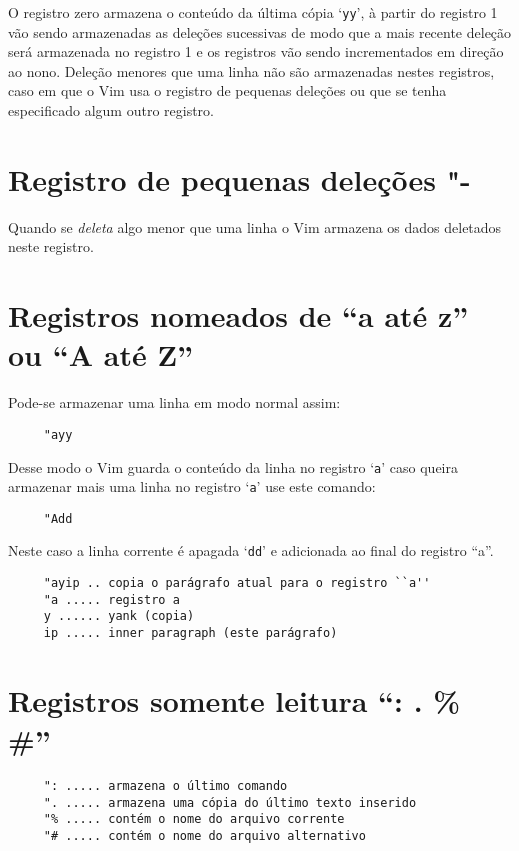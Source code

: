 O registro zero armazena o conteúdo da última cópia `{\tt yy}', à partir do
registro 1 vão sendo armazenadas as deleções sucessivas de modo que a
mais recente deleção será armazenada no registro 1 e os registros vão
sendo incrementados em direção ao nono.  Deleção menores que uma linha
não são armazenadas nestes registros, caso em que o Vim usa o registro
de pequenas deleções ou que se tenha especificado algum outro
registro.


\section{Registro de pequenas deleções "-}
\label{Registro de pequenas deleções "-}

Quando se {\em deleta} algo menor que uma linha o Vim armazena os dados
deletados neste registro.

\section{Registros nomeados de ``a até z'' ou ``A até Z''}
\label{Registros nomeados de ``a até z'' ou ``A até Z''}
Pode-se armazenar uma linha em modo normal assim:

\begin{verbatim}
     "ayy
\end{verbatim}

Desse modo o Vim guarda o conteúdo da linha no registro `{\tt a}' caso
queira armazenar mais uma linha no registro `{\tt a}' use este comando:

\begin{verbatim}
     "Add
\end{verbatim}

Neste caso a linha corrente é apagada `{\tt dd}' e  adicionada ao final do
registro ``a''.

\begin{verbatim}
     "ayip .. copia o parágrafo atual para o registro ``a''
     "a ..... registro a
     y ...... yank (copia)
     ip ..... inner paragraph (este parágrafo)
\end{verbatim}

\section{Registros somente leitura ``: . \% \#''}
\label{Registros somente leitura}

\begin{verbatim}
     ": ..... armazena o último comando
     ". ..... armazena uma cópia do último texto inserido
     "% ..... contém o nome do arquivo corrente
     "# ..... contém o nome do arquivo alternativo
\end{verbatim}

